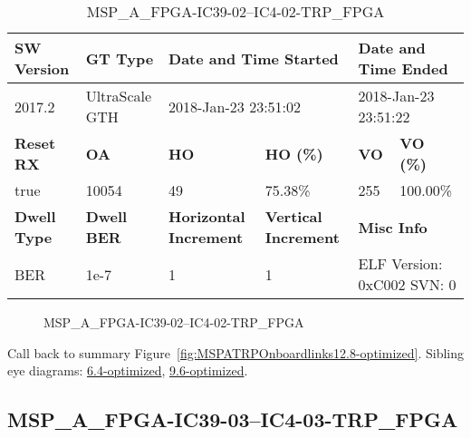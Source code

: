 \begin{table}[h]
\centering
\caption{MSP\_A\_FPGA-IC39-02--IC4-02-TRP\_FPGA}
\label{tab:MSPAFPGAIC3902IC402TRPFPGA12.8-optimized}
\begin{tabular}{@{}|l|l|l|l|l|l|@{}}
\toprule
\textbf{SW Version}                & \textbf{GT Type}   & \multicolumn{2}{l|}{\textbf{Date and Time Started}}            & \multicolumn{2}{l|}{\textbf{Date and Time Ended}}        \\ \midrule
2017.2                       & UltraScale GTH          & \multicolumn{2}{l|}{2018-Jan-23 23:51:02}                   & \multicolumn{2}{l|}{2018-Jan-23 23:51:22}               \\ \midrule
\textbf{Reset RX}                  & \textbf{OA} & \textbf{HO}   & \textbf{HO (\%)} & \textbf{VO} & \textbf{VO (\%)} \\ \midrule
true & 10054        & 49          & 75.38\%        & 255        & 100.00\%       \\ \midrule
\textbf{Dwell Type}                & \textbf{Dwell BER} & \textbf{Horizontal Increment} & \textbf{Vertical Increment}    & \multicolumn{2}{l|}{\textbf{Misc Info}}                  \\ \midrule
BER                            & 1e-7        & 1        & 1           & \multicolumn{2}{l|}{ELF Version: 0xC002 SVN: 0}                         \\ \bottomrule
\end{tabular}
\end{table}

\begin{figure}[h]
\caption{MSP\_A\_FPGA-IC39-02--IC4-02-TRP\_FPGA} \label{fig:MSPAFPGAIC3902IC402TRPFPGA12.8-optimized}
\end{figure}

Call back to summary Figure~\ref{fig:MSPATRPOnboardlinks12.8-optimized}.
Sibling eye diagrams: \hyperref[sec:MSPAFPGAIC3902IC402TRPFPGA6.4-optimized]{6.4-optimized}, \hyperref[sec:MSPAFPGAIC3902IC402TRPFPGA9.6-optimized]{9.6-optimized}.

\clearpage
\newpage


\subsection{MSP\_A\_FPGA-IC39-03--IC4-03-TRP\_FPGA}\label{sec:MSPAFPGAIC3903IC403TRPFPGA12.8-optimized}

